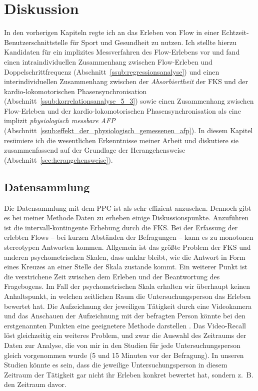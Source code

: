 

\chapter{Diskussion} \label{cha:diskussion} In den vorherigen Kapiteln regte ich an das Erleben von Flow in einer Echtzeit-Benutzerschnittstelle für Sport und Gesundheit zu nutzen. Ich stellte hierzu Kandidaten für ein implizites Messverfahren des Flow-Erlebens vor und fand einen intraindividuellen Zusammenhang zwischen Flow-Erleben und Doppelschrittfrequenz (Abschnitt~\ref{ssub:regressionsanalyse}) und einen interindividuellen Zusammenhang zwischen der \emph{Absorbiertheit} der \ac{FKS} und der kardio-lokomotorischen Phasensynchronisation (Abschnitt~\ref{ssub:korrelationsanalyse_5_3}) sowie einen Zusammenhang zwischen Flow-Erleben und der kardio-lokomotorischen Phasensynchronisation als eine implizit \emph{physiologisch messbare \ac{AFP}} (Abschnitt~\ref{ssub:effekt_der_physiologisch_gemessenen_afp}). In diesem Kapitel resümiere ich die wesentlichen Erkenntnisse meiner Arbeit und diskutiere sie zusammenfassend auf der Grundlage der Herangehensweise (Abschnitt~\ref{sec:herangehensweise}). 

\section{Datensammlung} 

\label{sec:datensammlung}

Die Datensammlung mit dem \ac{PPC} ist als sehr effizient anzusehen. Dennoch gibt es bei meiner Methode Daten zu erheben einige Diskussionspunkte. Anzuführen ist die intervall-kontingente Erhebung durch die \ac{FKS}. Bei der Erfassung der erlebten Flows -- bei kurzen Abständen der Befragungen -- kann es zu monotonen stereotypen Antworten kommen. Allgemein ist das größte Problem der \ac{FKS} und anderen psychometrischen Skalen, dass unklar bleibt, wie die Antwort in Form eines Kreuzes an einer Stelle der Skala zustande kommt. Ein weiterer Punkt ist die verstrichene Zeit zwischen dem Erleben und der Beantwortung des Fragebogens. Im Fall der psychometrischen Skala erhalten wir überhaupt keinen Anhaltspunkt, in welchen zeitlichen Raum die Untersuchungsperson das Erleben bewertet hat. Die Aufzeichnung der jeweiligen Tätigkeit durch eine Videokamera und das Anschauen der Aufzeichnung mit der befragten Person könnte bei den erstgenannten Punkten eine geeignetere Methode darstellen \citep[Video-Recall,][S.~566]{Leuchter2006}. Das Video-Recall löst gleichzeitig ein weiteres Problem, und zwar die Auswahl des Zeitraums der Daten zur Analyse, die von mir in den Studien für jede Untersuchungsperson gleich vorgenommen wurde (5 und 15 Minuten vor der Befragung). In unseren Studien könnte es sein, dass die jeweilige Untersuchungsperson in diesem Zeitraum der Tätigkeit gar nicht ihr Erleben konkret bewertet hat, sondern z.~B. den Zeitraum davor. 


